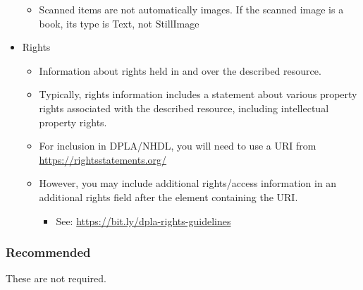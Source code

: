 \documentclass[11pt]{article}
\begin{document}
\begin{itemize}
\begin{itemize}
\item Scanned items are not automatically images. If the scanned image is a book, its type is Text, not StillImage
\end{itemize}
\item Rights
\label{sec:orgeb0a084}
\begin{itemize}
\item Information about rights held in and over the described resource.
\item Typically, rights information includes a statement about various property rights associated with the described resource, including intellectual property rights.
\item For inclusion in DPLA/NHDL, you will need to use a URI from \url{https://rightsstatements.org/}
\item However, you may include additional rights/access information in an additional rights field after the element containing the URI.
\begin{itemize}
\item See: \url{https://bit.ly/dpla-rights-guidelines}
\end{itemize}
\end{itemize}
\end{itemize}

\subsubsection*{Recommended}
\label{sec:orga14c84c}

These are not required.
\end{document}
